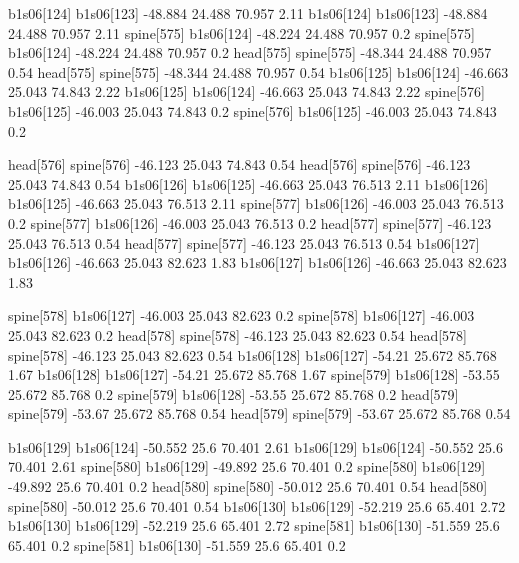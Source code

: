 b1s06[124]    b1s06[123]    -48.884    24.488    70.957    2.11
b1s06[124]    b1s06[123]    -48.884    24.488    70.957    2.11
spine[575]    b1s06[124]    -48.224    24.488    70.957    0.2
spine[575]    b1s06[124]    -48.224    24.488    70.957    0.2
head[575]    spine[575]    -48.344    24.488    70.957    0.54
head[575]    spine[575]    -48.344    24.488    70.957    0.54
b1s06[125]    b1s06[124]    -46.663    25.043    74.843    2.22
b1s06[125]    b1s06[124]    -46.663    25.043    74.843    2.22
spine[576]    b1s06[125]    -46.003    25.043    74.843    0.2
spine[576]    b1s06[125]    -46.003    25.043    74.843    0.2


head[576]    spine[576]    -46.123    25.043    74.843    0.54
head[576]    spine[576]    -46.123    25.043    74.843    0.54
b1s06[126]    b1s06[125]    -46.663    25.043    76.513    2.11
b1s06[126]    b1s06[125]    -46.663    25.043    76.513    2.11
spine[577]    b1s06[126]    -46.003    25.043    76.513    0.2
spine[577]    b1s06[126]    -46.003    25.043    76.513    0.2
head[577]    spine[577]    -46.123    25.043    76.513    0.54
head[577]    spine[577]    -46.123    25.043    76.513    0.54
b1s06[127]    b1s06[126]    -46.663    25.043    82.623    1.83
b1s06[127]    b1s06[126]    -46.663    25.043    82.623    1.83


spine[578]    b1s06[127]    -46.003    25.043    82.623    0.2
spine[578]    b1s06[127]    -46.003    25.043    82.623    0.2
head[578]    spine[578]    -46.123    25.043    82.623    0.54
head[578]    spine[578]    -46.123    25.043    82.623    0.54
b1s06[128]    b1s06[127]    -54.21    25.672    85.768    1.67
b1s06[128]    b1s06[127]    -54.21    25.672    85.768    1.67
spine[579]    b1s06[128]    -53.55    25.672    85.768    0.2
spine[579]    b1s06[128]    -53.55    25.672    85.768    0.2
head[579]    spine[579]    -53.67    25.672    85.768    0.54
head[579]    spine[579]    -53.67    25.672    85.768    0.54


b1s06[129]    b1s06[124]    -50.552    25.6    70.401    2.61
b1s06[129]    b1s06[124]    -50.552    25.6    70.401    2.61
spine[580]    b1s06[129]    -49.892    25.6    70.401    0.2
spine[580]    b1s06[129]    -49.892    25.6    70.401    0.2
head[580]    spine[580]    -50.012    25.6    70.401    0.54
head[580]    spine[580]    -50.012    25.6    70.401    0.54
b1s06[130]    b1s06[129]    -52.219    25.6    65.401    2.72
b1s06[130]    b1s06[129]    -52.219    25.6    65.401    2.72
spine[581]    b1s06[130]    -51.559    25.6    65.401    0.2
spine[581]    b1s06[130]    -51.559    25.6    65.401    0.2


